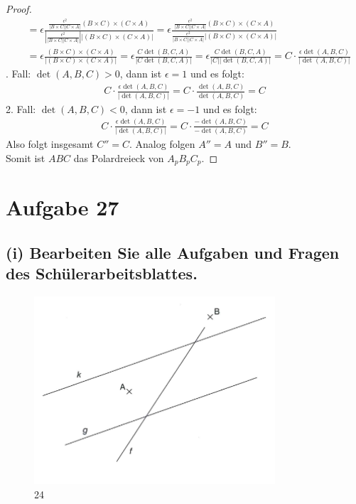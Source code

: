 \documentclass[12pt,a4paper]{article}
\begin{document}
\begin{proof}
\begin{align*}
    &= \epsilon \frac{\frac{\epsilon^2}{|B \times C||C \times A|} (B \times C) \times (C\times A)}{\left|\frac{\epsilon^2}{|B \times C||C \times A|} \right| \left|(B \times C) \times (C\times A) \right|} =  \epsilon \frac{\frac{\epsilon^2}{|B \times C||C \times A|} (B \times C) \times (C\times A)}{\frac{\epsilon^2}{|B \times C||C \times A|} \left|(B \times C) \times (C\times A) \right|} \\
    &= \epsilon \frac{(B \times C) \times(C \times A)}{|(B \times C) \times(C \times A)|} = \epsilon \frac{C \det(B, C, A)}{|C \det(B, C, A)|} = \epsilon \frac{C \det(B, C, A)}{|C||\det(B, C, A)|} = C \cdot \frac{\epsilon \det (A, B, C)}{|\det(A, B, C)|}
\end{align*}
\newpage
{}. Fall: $\det(A, B, C) > 0$, dann ist $\epsilon = 1$ und es folgt:
\begin{align*}
    C \cdot \frac{\epsilon \det(A, B, C)}{|\det(A, B, C)|} = C \cdot \frac{\det(A, B, C)}{\det(A, B, C)} = C
\end{align*}
2. Fall: $\det(A, B, C) < 0$, dann ist $\epsilon = -1$ und es folgt:
\begin{align*}
C \cdot \frac{\epsilon \det(A, B, C)}{|\det(A, B, C)|} = C \cdot \frac{-\det(A, B, C)}{-\det(A, B, C)} = C
\end{align*}
\noindent Also folgt insgesamt $C'' = C$. Analog folgen $A'' = A$ und $B'' = B$. \\
Somit ist $ABC$ das Polardreieck von $A_pB_pC_p$.
\end{proof}

\newpage
\section*{Aufgabe 27}
\subsection*{(i) Bearbeiten Sie alle Aufgaben und Fragen des Schülerarbeitsblattes.}
\begin{figure}[htbp]     
    \centering             
    \includegraphics[width=0.8\textwidth]{Euklidische_Ebene.png}     
    \caption{24}     
    \label{fig:24} 
\end{figure}
\end{document}
